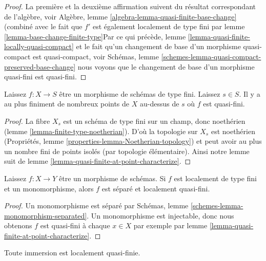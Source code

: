 \begin{proof}

La première et la deuxième affirmation suivent du résultat correspondant de l'algèbre, voir Algèbre, lemme \ref{algebra-lemma-quasi-finite-base-change}
(combiné avec le fait que $f'$ est également localement de type fini par lemme \ref{lemma-base-change-finite-type}Par ce qui précède, lemme \ref{lemma-quasi-finite-locally-quasi-compact}
et le fait qu'un changement de base d'un morphisme quasi-compact est quasi-compact, voir Schémas, lemme \ref{schemes-lemma-quasi-compact-preserved-base-change}
nous voyons que le changement de base d'un morphisme quasi-fini est quasi-fini.

\end{proof}

\begin{lemma}

\label{lemma-quasi-finite-at-a-finite-number-of-points}
Laissez $f : X \to S$ être un morphisme de schémas de type fini. Laissez $s \in S$. Il y a au plus finiment de nombreux points de $X$ au-dessus de $s$ où $f$ est quasi-fini.
\end{lemma}

\begin{proof}
La fibre $X_s$ est un schéma de type fini sur un champ, donc noethérien (lemme \ref{lemma-finite-type-noetherian}). D'où la topologie sur $X_s$ est noethérien (Propriétés, lemme \ref{properties-lemma-Noetherian-topology}) et peut avoir au plus un nombre fini de points isolés (par topologie élémentaire). Ainsi notre lemme suit de lemme \ref{lemma-quasi-finite-at-point-characterize}.
\end{proof}

\begin{lemma}

\label{lemma-monomorphism-loc-finite-type-loc-quasi-finite}
Laissez $f : X \to Y$ être un morphisme de schémas. Si $f$ est localement de type fini et un monomorphisme, alors $f$ est séparé et localement quasi-fini.
\end{lemma}

\begin{proof}
Un monomorphisme est séparé par Schémas, lemme \ref{schemes-lemma-monomorphism-separated}. Un monomorphisme est injectable, donc nous obtenons $f$ est quasi-fini à chaque $x \in X$ par exemple par lemme \ref{lemma-quasi-finite-at-point-characterize}.
\end{proof}

\begin{lemma}

\label{lemma-immersion-locally-quasi-finite}

Toute immersion est localement quasi-finie.

\end{lemma}

